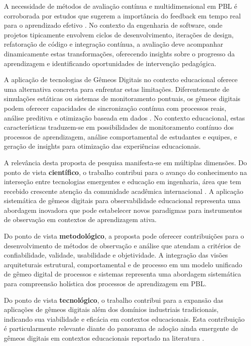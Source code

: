 \documentclass[12pt,a4paper]{article}
\begin{document}
A necessidade de métodos de avaliação contínua e multidimensional em PBL é
corroborada por estudos que sugerem a importância do feedback em tempo real
para o aprendizado efetivo \cite{thomas2000}. No contexto da engenharia de
software, onde projetos tipicamente envolvem ciclos de desenvolvimento,
iterações de design, refatoração de código e integração contínua, a avaliação
deve acompanhar dinamicamente estas transformações, oferecendo insights sobre o
progresso da aprendizagem e identificando oportunidades de intervenção
pedagógica.

A aplicação de tecnologias de Gêmeos Digitais no contexto educacional
oferece uma alternativa concreta para enfrentar estas limitações.
Diferentemente de simulações estáticas ou sistemas de monitoramento pontuais,
os gêmeos digitais podem oferecer capacidades de sincronização contínua com
processos reais, análise preditiva e otimização baseada em dados
\cite{grieves2014, tao2018}. No contexto educacional, estas características
traduzem-se em possibilidades de monitoramento contínuo dos processos de
aprendizagem, análise comportamental de estudantes e equipes, e geração de
insights para otimização das experiências educacionais.

A relevância desta proposta de pesquisa manifesta-se em múltiplas dimensões. Do
ponto de vista \textbf{científico}, o trabalho contribui para o avanço do
conhecimento na interseção entre tecnologias emergentes e educação em
ingenharia, área que tem recebido crescente atenção da comunidade acadêmica
internacional \cite{romero2020}. A aplicação sistemática de gêmeos digitais para observabilidade
educacional representa uma abordagem inovadora que pode estabelecer novos
paradigmas para instrumentos de observação em contextos de aprendizagem ativa.

Do ponto de vista \textbf{metodológico}, a proposta pode oferecer contribuições
para o desenvolvimento de métodos de observação e análise que atendam a
critérios de confiabilidade, validade, usabilidade e objetividade. A integração das visões arquiteturais estrutural,
comportamental e de processo em um modelo unificado de gêmeo digital de
processos e sistemas representa uma abordagem sistemática para compreensão
holística dos processos de aprendizagem em PBL.

Do ponto de vista \textbf{tecnológico}, o trabalho contribui para a expansão
das aplicações de gêmeos digitais além dos domínios industriais tradicionais,
indicando sua viabilidade e eficácia em contextos educacionais. Esta
contribuição é particularmente relevante diante do panorama de adoção ainda
emergente de gêmeos digitais em contextos educacionais reportado na literatura \cite{barricelli2019}.
\end{document}

